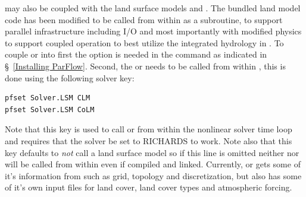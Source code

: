 \parflow{} may also be coupled with the land surface models  \cite{Dai03} and .
The bundled land model code has been modified to be called from within \parflow{}
as a subroutine, to support parallel infrastructure including I/O and most importantly with modified
physics to support coupled operation to best utilize the integrated hydrology
 in \parflow{} \cite{MM05, KM08a}.  To couple  or  into \parflow{} first the
  option is needed in the  command as indicated in \S~\ref{Installing ParFlow}.
 Second, the  or  needs to be called from within \parflow{}, this is done using the following
 solver key:
\begin{verbatim}
pfset Solver.LSM CLM
pfset Solver.LSM CoLM
\end{verbatim}
Note that this key is used to call  or  from within the nonlinear solver time loop
and requires that the solver be set to RICHARDS to work.  Note also that this key defaults to
\emph{not} call a land surface model so if this line is omitted neither  nor  will be called from within
\parflow{} even if compiled and linked.  Currently,  or  gets some of it's information from \parflow{}
such as grid, topology and discretization, but also has some of it's own input files for land cover, land cover
types and atmospheric forcing.
